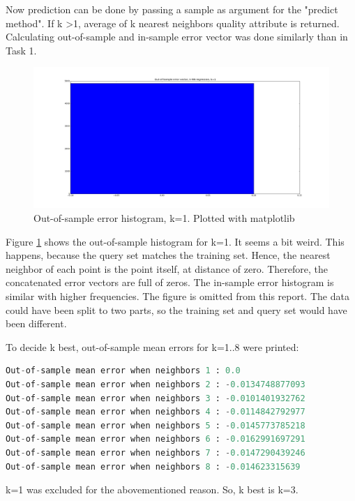 \documentclass[12pt]{article}
\begin{document}
Now prediction can be done by passing a sample as argument for the "predict method". If k \textgreater 1, average of k nearest neighbors quality attribute is returned. Calculating out-of-sample and in-sample error vector was done similarly than in Task 1.

\begin{figure}[H]
    \centering
    \includegraphics[width=1\textwidth]{figures/task2/k1_oos}
    \caption{Out-of-sample error histogram, k=1. Plotted with matplotlib}
    \label{fig:k1_oos_task2}
\end{figure}

Figure \ref{fig:k1_oos_task2} shows the out-of-sample histogram for k=1. It seems a bit weird. This happens, because the query set matches the training set. Hence, the nearest neighbor of each point is the point itself, at distance of zero. Therefore, the concatenated error vectors are full of zeros. The in-sample error histogram is similar with higher frequencies. The figure is omitted from this report. The data could have been split to two parts, so the training set and query set would have been different.

To decide k best, out-of-sample mean errors for k=1..8 were printed:

\begin{lstlisting}[language=Python]
Out-of-sample mean error when neighbors 1 : 0.0
Out-of-sample mean error when neighbors 2 : -0.0134748877093
Out-of-sample mean error when neighbors 3 : -0.0101401932762
Out-of-sample mean error when neighbors 4 : -0.0114842792977
Out-of-sample mean error when neighbors 5 : -0.0145773785218
Out-of-sample mean error when neighbors 6 : -0.0162991697291
Out-of-sample mean error when neighbors 7 : -0.0147290439246
Out-of-sample mean error when neighbors 8 : -0.014623315639
\end{lstlisting}

k=1 was excluded for the abovementioned reason. So, k best is k=3.
\end{document}
